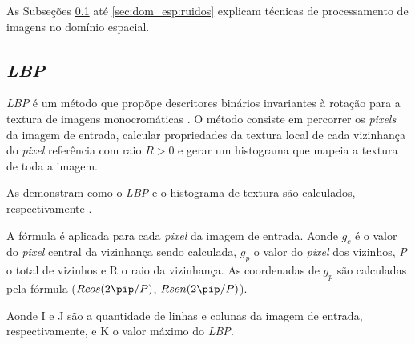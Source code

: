
\par As Subseções \ref{sec:dom_esp:lbp} até \ref{sec:dom_esp:ruidos} explicam técnicas de processamento de imagens no domínio espacial.

\subsection{\textit{\acrfull{LBP}}}\label{sec:dom_esp:lbp}

\par \textit{\acrshort{LBP}} é um método que propõpe descritores binários invariantes à rotação para a textura de imagens monocromáticas \cite{ojala2002LBP}. O método consiste em percorrer os \textit{pixels} da imagem de entrada, calcular propriedades da textura local de cada vizinhança do \textit{pixel} referência com raio $R > 0$ e gerar um histograma que mapeia a textura de toda a imagem.

\par As  demonstram como o \textit{\acrshort{LBP}} e o histograma de textura são calculados, respectivamente \cite{ojala2002LBP}\cite{guo2010-CLBP}.

       
\par A fórmula é aplicada para cada \textit{pixel} da imagem de entrada. Aonde $g_{c}$ é o valor do \textit{pixel} central da vizinhança sendo calculada, $g_{p}$ o valor do \textit{pixel} dos vizinhos, \textit{P} o total de vizinhos e R o raio da vizinhança. As coordenadas de $g_{p}$ são calculadas pela fórmula ($Rcos(2\pip/P)$, $Rsen(2\pip/P)$). 


\par Aonde I e J são a quantidade de linhas e colunas da imagem de entrada, respectivamente, e K o valor máximo do \textit{\acrshort{LBP}}.

